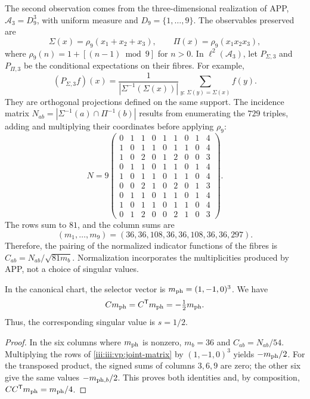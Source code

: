 The second observation comes from the three-dimensional realization of APP,
$\mathcal A_3=D_9^3$, with uniform measure and
$D_9=\{1,\ldots,9\}$. The observables preserved are
\[
 \Sigma(x)=\rho_9(x_1+x_2+x_3),\qquad
 \Pi(x)=\rho_9(x_1x_2x_3),
\]
where $\rho_9(n)=1+[(n-1)\bmod9]$ for $n>0$. In
$\ell^2(\mathcal A_3)$, let $P_{\Sigma,3}$ and $P_{\Pi,3}$ be
the conditional expectations on their fibres. For example,
\[
 (P_{\Sigma,3}f)(x)=
 \frac1{|\Sigma^{-1}(\Sigma(x))|}
 \sum_{y:\,\Sigma(y)=\Sigma(x)}f(y).
\]
They are orthogonal projections defined on the same support. The incidence
matrix $N_{ab}=|\Sigma^{-1}(a)\cap\Pi^{-1}(b)|$ results from
enumerating the $729$ triples, adding and multiplying their coordinates before
applying $\rho_9$:
\begin{equation}
 N=9\begin{pmatrix}
 0&1&1&0&1&1&0&1&4\\
 1&0&1&1&0&1&1&0&4\\
 1&0&2&0&1&2&0&0&3\\
 0&1&1&0&1&1&0&1&4\\
 1&0&1&1&0&1&1&0&4\\
 0&0&2&1&0&2&0&1&3\\
 0&1&1&0&1&1&0&1&4\\
 1&0&1&1&0&1&1&0&4\\
 0&1&2&0&0&2&1&0&3
 \end{pmatrix}.
 \label{iii:iii:vp:joint-matrix}
\end{equation}
The rows sum to $81$, and the column sums are
\[
 (m_1,\ldots,m_9)=(36,36,108,36,36,108,36,36,297).
\]
Therefore, the pairing of the normalized indicator functions of the fibres
is $C_{ab}=N_{ab}/\sqrt{81m_b}$. Normalization incorporates the
multiplicities produced by APP, not a choice of singular values.

\begin{proposition}
In the canonical chart, the selector vector is
$m_{\rm ph}=(1,-1,0)^3$. We have
\begin{equation}
 Cm_{\rm ph}=C^{\mathsf T}m_{\rm ph}=-\tfrac12m_{\rm ph}.
 \label{iii:iii:vp:trit-mode}
\end{equation}
Thus, the corresponding singular value is $s=1/2$.
\end{proposition}
\begin{proof}
In the six columns where $m_{\rm ph}$ is nonzero, $m_b=36$ and
$C_{ab}=N_{ab}/54$. Multiplying the rows of
\eqref{iii:iii:vp:joint-matrix} by $(1,-1,0)^3$ yields
$-m_{\rm ph}/2$. For the transposed product, the signed sums
of columns $3,6,9$ are zero; the other six give the same
values $-m_{{\rm ph},b}/2$. This proves both identities and, by
composition, $CC^{\mathsf T}m_{\rm ph}=m_{\rm ph}/4$.
\end{proof}

